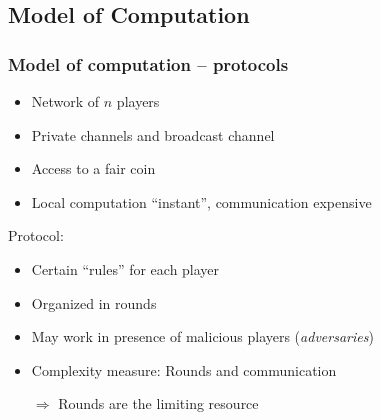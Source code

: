 \documentclass{beamer}
\begin{document}


\subsection{Model of Computation}
\label{sec:model-of-computation}

\begin{frame}
  \frametitle{Model of computation -- protocols}
  \begin{itemize}
  \item Network of $n$ players
  \item Private channels and broadcast channel
  \item Access to a fair coin
  \item Local computation ``instant'', communication expensive
  \end{itemize}
  Protocol:
  \begin{itemize}
  \item Certain ``rules'' for each player
  \item Organized in rounds
  \item May work in presence of malicious players (\emph{adversaries})
  \item Complexity measure: Rounds and communication
    
    $\Rightarrow$ Rounds are the limiting resource
  \end{itemize}
\end{frame}
\end{document}
